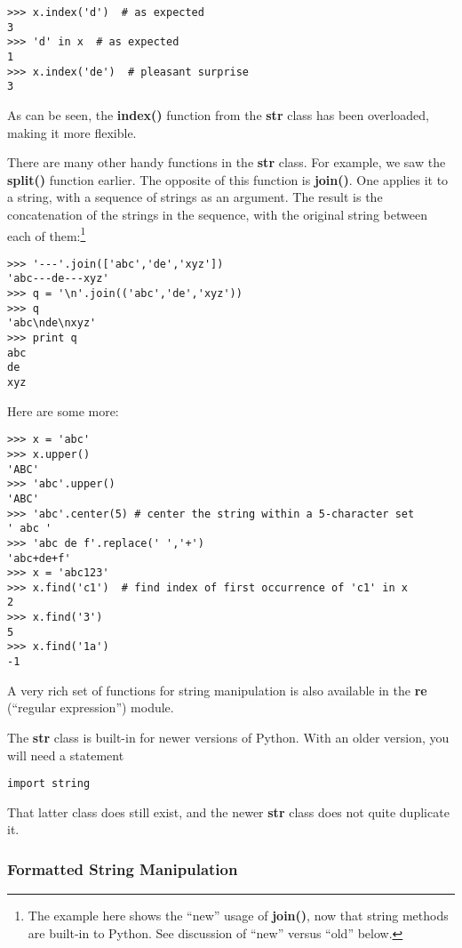\begin{Verbatim}[fontsize=\relsize{-2}]
>>> x.index('d')  # as expected
3
>>> 'd' in x  # as expected 
1
>>> x.index('de')  # pleasant surprise
3
\end{Verbatim}

As can be seen, the {\bf index()} function from the {\bf str} class
has been overloaded, making it more flexible. 

There are many other handy functions in the {\bf str} class.  For
example, we saw the {\bf split()} function earlier.  The opposite of
this function is {\bf join()}.  One applies it to a string, with a
sequence of strings as an argument.  The result is the concatenation of
the strings in the sequence, with the original string between each of
them:\footnote{The example here shows the ``new'' usage of {\bf join()},
now that string methods are built-in to Python.  See discussion of
``new'' versus ``old'' below.}

\begin{Verbatim}[fontsize=\relsize{-2}]
>>> '---'.join(['abc','de','xyz'])
'abc---de---xyz'
>>> q = '\n'.join(('abc','de','xyz'))
>>> q
'abc\nde\nxyz'
>>> print q
abc
de
xyz
\end{Verbatim}

Here are some more:

\begin{Verbatim}[fontsize=\relsize{-2}]
>>> x = 'abc'
>>> x.upper()
'ABC'
>>> 'abc'.upper()
'ABC'
>>> 'abc'.center(5) # center the string within a 5-character set
' abc '
>>> 'abc de f'.replace(' ','+')
'abc+de+f'
>>> x = 'abc123'
>>> x.find('c1')  # find index of first occurrence of 'c1' in x
2
>>> x.find('3')
5
>>> x.find('1a')
-1
\end{Verbatim}

A very rich set of functions for string manipulation is also available
in the {\bf re} (``regular expression'') module.

The {\bf str} class is built-in for newer versions of Python.  With
an older version, you will need a statement

\begin{Verbatim}[fontsize=\relsize{-2}]
import string
\end{Verbatim}

That latter class does still exist, and the newer {\bf str} class does
not quite duplicate it.

\subsubsection{Formatted String Manipulation}
\label{formatted}

